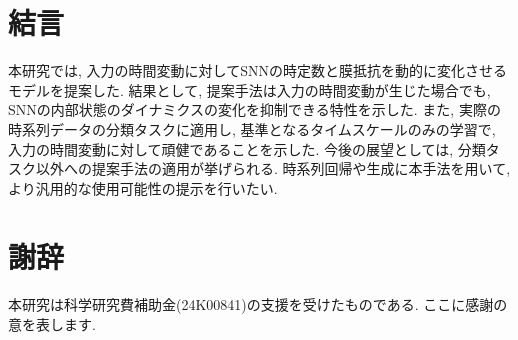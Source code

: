 \section{結言}

本研究では, 入力の時間変動に対してSNNの時定数と膜抵抗を動的に変化させるモデルを提案した.
結果として, 提案手法は入力の時間変動が生じた場合でも, SNNの内部状態のダイナミクスの変化を抑制できる特性を示した.
また, 実際の時系列データの分類タスクに適用し, 基準となるタイムスケールのみの学習で, 入力の時間変動に対して頑健であることを示した.
今後の展望としては, 分類タスク以外への提案手法の適用が挙げられる.
時系列回帰や生成に本手法を用いて, より汎用的な使用可能性の提示を行いたい.
% 
% 
% 
\section{謝辞}
本研究は科学研究費補助金(24K00841)の支援を受けたものである. ここに感謝の意を表します.